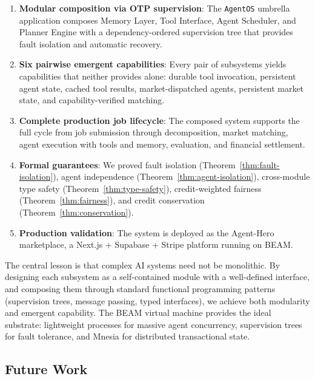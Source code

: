 \documentclass[12pt,a4paper]{article}
\theoremstyle{definition}
\begin{document}
\begin{enumerate}
  \item \textbf{Modular composition via OTP supervision}: The \texttt{AgentOS}
        umbrella application composes Memory Layer, Tool Interface, Agent Scheduler,
        and Planner Engine with a dependency-ordered supervision tree that provides
        fault isolation and automatic recovery.

  \item \textbf{Six pairwise emergent capabilities}: Every pair of subsystems
        yields capabilities that neither provides alone: durable tool invocation,
        persistent agent state, cached tool results, market-dispatched agents,
        persistent market state, and capability-verified matching.

  \item \textbf{Complete production job lifecycle}: The composed system supports
        the full cycle from job submission through decomposition, market matching,
        agent execution with tools and memory, evaluation, and financial settlement.

  \item \textbf{Formal guarantees}: We proved fault isolation (Theorem~\ref{thm:fault-isolation}),
        agent independence (Theorem~\ref{thm:agent-isolation}), cross-module type
        safety (Theorem~\ref{thm:type-safety}), credit-weighted fairness
        (Theorem~\ref{thm:fairness}), and credit conservation
        (Theorem~\ref{thm:conservation}).

  \item \textbf{Production validation}: The system is deployed as the Agent-Hero
        marketplace, a Next.js + Supabase + Stripe platform running on BEAM.
\end{enumerate}

The central lesson is that complex AI systems need not be monolithic.
By designing each subsystem as a self-contained module with a well-defined
interface, and composing them through standard functional programming patterns
(supervision trees, message passing, typed interfaces), we achieve both
modularity and emergent capability. The BEAM virtual machine provides the
ideal substrate: lightweight processes for massive agent concurrency,
supervision trees for fault tolerance, and Mnesia for distributed
transactional state.

\subsection{Future Work}
\end{document}
